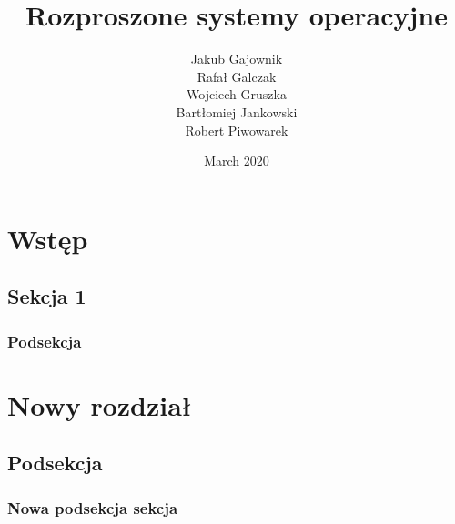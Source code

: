 \documentclass{report}
\title{Rozproszone systemy operacyjne}
\author{Jakub Gajownik \\
Rafał Galczak \\
Wojciech Gruszka \\
Bartłomiej Jankowski \\
Robert Piwowarek}
\date{March 2020}
\begin{document}
\maketitle

\chapter{Wstęp}
\section{Sekcja 1}

\subsection{Podsekcja}



\chapter{Nowy rozdział}

\section{Podsekcja}

\subsection{Nowa podsekcja sekcja}
\end{document}
